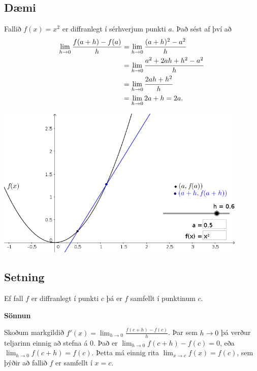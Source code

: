 \documentclass[b5paper,10pt,icelandic]{sphinxmanual}
\begin{document}
\subsection{Dæmi}
\label{kafli03:daemi}
Fallið \(f(x) = x^2\) er diffranlegt í sérhverjum punkti \(a\).
Það sést af því að
\begin{gather}
\begin{split}\begin{aligned}
\lim_{h\to 0} \frac{f(a+h)-f(a)}{h}
&= \lim_{h\to 0} \frac{(a+h)^2-a^2}{h}\\
&= \lim_{h\to 0} \frac{a^2+2ah+h^2-a^2}{h}\\
&= \lim_{h\to 0} \frac{2ah+h^2}{h}\\
&= \lim_{h\to 0} 2a+h = 2a.\end{aligned}\end{split}\notag
\end{gather}

\begin{center}
\includegraphics[width=12cm,keepaspectratio=true]{./01_afleida.png}
\end{center}



\subsection{Setning}
\label{kafli03:setning}
Ef fall \(f\) er diffranlegt í punkti \(c\) þá er \(f\)
samfellt í punktinum \(c\).

\textbf{Sönnun}

Skoðum markgildið \(f'(x)=\lim_{h\to 0} \frac{f(c+h)-f(c)}{h}\). Þar
sem \(h\to 0\) þá verður teljarinn einnig að stefna á 0. Það er
\(\lim_{h \to 0} f(c+h)-f(c) = 0\), eða
\(\lim_{h \to 0} f(c+h) = f(c)\). Þetta má einnig rita
\(\lim_{x \to c} f(x) = f(c)\), sem þýðir að fallið \(f\) er
samfellt í \(x=c\).
\end{document}
